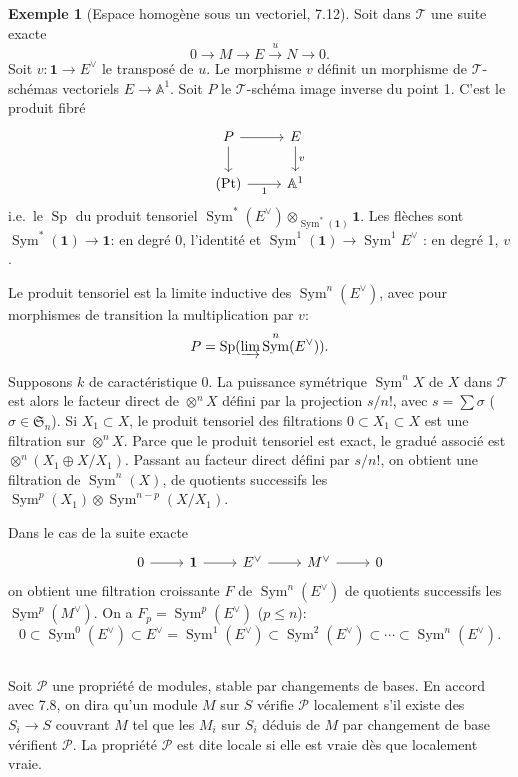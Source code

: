 \documentclass[12pt,a4paper]{article}
\theoremstyle{plain}
\theoremstyle{definition}
\newtheorem{example}[theorem]{Exemple}
\DeclareMathOperator{\Sp}{Sp}
\DeclareMathOperator{\Sym}{Sym}
\begin{document}
\begin{example}[Espace homogène sous un vectoriel, 7.12]
Soit dans $\mathcal{T}$ une suite exacte
\[
0 \to M \to E \xrightarrow{u} N \to 0.
\]
Soit $v : \mathbf{1} \to E^\vee$ le transposé de $u$. Le morphisme $v$ définit un morphisme de $\mathcal{T}$-schémas vectoriels $E \to \mathbb{A}^1$. Soit $P$ le $\mathcal{T}$-schéma image inverse du point 1. C'est le produit fibré
\[
\begin{tikzcd}
P \arrow[r] \arrow[d] & E \arrow[d, "v"] \\
(\mathrm{Pt}) \arrow[r, "1"'] & \mathbb{A}^1
\end{tikzcd}
\]
i.e.~le $\Sp$ du produit tensoriel $\Sym^*(E^\vee) \otimes_{\Sym^*(\mathbf{1})} \mathbf{1}$. Les flèches sont $\Sym^*(\mathbf{1}) \to \mathbf{1}$: en degré 0, l'identité et $\Sym^1(\mathbf{1}) \to \Sym^1 E^\vee$ : en degré 1, $v$.

Le produit tensoriel est la limite inductive des $\Sym^n(E^\vee)$, avec pour morphismes de transition la multiplication par $v$:
\[
P = \Sp(\varinjlim \Sym^n(E^\vee)).
\]

Supposons $k$ de caractéristique 0. La puissance symétrique $\Sym^n X$ de $X$ dans $\mathcal{T}$ est alors le facteur direct de $\otimes^n X$ défini par la projection $s/n!$, avec $s = \sum \sigma$ ($\sigma \in \mathfrak{S}_n$). Si $X_1 \subset X$, le produit tensoriel des filtrations $0 \subset X_1 \subset X$ est une filtration sur $\otimes^n X$. Parce que le produit tensoriel est exact, le gradué associé est $\otimes^n (X_1 \oplus X/X_1)$. Passant au facteur direct défini par $s/n!$, on obtient une filtration de $\Sym^n(X)$, de quotients successifs les $\Sym^p(X_1) \otimes \Sym^{n-p}(X/X_1)$.

Dans le cas de la suite exacte
\[
\begin{tikzcd}
0 \arrow[r] & \mathbf{1} \arrow[r] & E^\vee \arrow[r] & M^\vee \arrow[r] & 0
\end{tikzcd}
\]
on obtient une filtration croissante $F$ de $\Sym^n(E^\vee)$ de quotients successifs les $\Sym^p(M^\vee)$. On a $F_p = \Sym^p(E^\vee)$ ($p \leq n$):
\[
0 \subset \Sym^0(E^\vee) \subset E^\vee = \Sym^1(E^\vee) \subset \Sym^2(E^\vee) \subset \cdots \subset \Sym^n(E^\vee).
\]
\end{example}

\subsection{}

Soit $\mathcal{P}$ une propriété de modules, stable par changements de bases. En accord avec 7.8, on dira qu'un module $M$ sur $S$ vérifie $\mathcal{P}$ localement s'il existe des $S_i \to S$ couvrant $M$ tel que les $M_i$ sur $S_i$ déduis de $M$ par changement de base vérifient $\mathcal{P}$. La propriété $\mathcal{P}$ est dite locale si elle est vraie dès que localement vraie.
\end{document}
